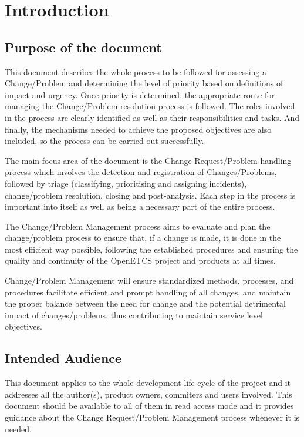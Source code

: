 \documentclass{template/openetcs_article}
\begin{document}
\newpage

\section{Introduction}

\subsection[Introduction]{Purpose of the document}
This document describes the whole process to be followed for assessing a Change/Problem and determining the level of priority based on definitions of impact and urgency. Once priority is determined, the appropriate route for managing the Change/Problem resolution process is followed. The roles involved in the process are clearly identified as well as their responsibilities and tasks. And finally, the mechanisms needed to achieve the proposed objectives are also included, so the process can be carried out successfully.

The main focus area of the document is the Change Request/Problem handling process which involves the detection and registration of Changes/Problems, followed by triage (classifying, prioritising and assigning incidents), change/problem resolution, closing and post-analysis.
Each step in the process is important into itself as well as being a necessary part of the entire process.

The Change/Problem Management process aims to evaluate and plan the change/problem process to ensure that, if a change is made, it is done in the most efficient way possible, following the established procedures and ensuring the quality and continuity of the OpenETCS project and products at all times.

Change/Problem Management will ensure standardized methods, processes, and procedures facilitate efficient and prompt handling of all changes, and maintain the proper balance between the need for change and
the potential detrimental impact of changes/problems, thus contributing to maintain service level objectives.


\subsection{Intended Audience}
This document applies to the whole development life-cycle of the project and it addresses all the author(s), product owners, commiters and users involved. This document should be available to all of them in read access mode and it provides guidance about the Change Request/Problem Management process whenever it is needed. 
\end{document}

